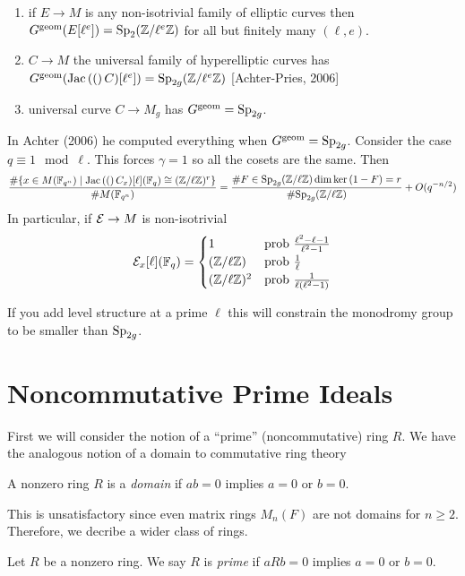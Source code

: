 \documentclass[12pt]{article}
\begin{document}
\begin{example}
\begin{enumerate}
\item if $E \to M$ is any non-isotrivial family of elliptic curves then $G^{\mathrm{geom}}(E[\ell^e]) = \mathrm{Sp}_2(\mathbb{Z} / \ell^e \mathbb{Z})$ for all but finitely many $(\ell, e)$. 
\item $C \to M$ the universal family of hyperelliptic curves has $G^{\mathrm{geom}}(\mathrm{Jac}\left( ( \right)C)[\ell^e]) = \mathrm{Sp}_{2g}(\mathbb{Z} / \ell^e \mathbb{Z})$ [Achter-Pries, 2006]
\item universal curve $C \to M_g$ has $G^{\mathrm{geom}} = \mathrm{Sp}_{2g}$. 
\end{enumerate}

In Achter (2006) he computed everything when $G^{\mathrm{geom}} = \mathrm{Sp}_{2g}$. Consider the case $q \equiv 1 \mod \ell$. This forces $\gamma = 1$ so all the cosets are the same. Then
\[ \frac{\# \{ x \in M(\mathbb{F}_{q^n}) \mid \mathrm{Jac}\left( ( \right)C_x)[\ell](\mathbb{F}_q) \cong (\mathbb{Z} / \ell \mathbb{Z})^r \}}{\# M(\mathbb{F}_{q^n})} = \frac{\# F \in \mathrm{Sp}_{2g}(\mathbb{Z} / \ell \mathbb{Z}) \dim \ker{(1 - F)} = r}{\# \mathrm{Sp}_{2g}(\mathbb{Z} / \ell \mathbb{Z})} + O(q^{-n/2}) \]
In particular, if $\mathcal{E} \to M$ is non-isotrivial 
\[ \mathcal{E}_x[\ell](\mathbb{F}_q) = 
\begin{cases}
1 & \text{prob } \frac{\ell^2 - \ell - 1}{\ell^2 - 1}
\\
(\mathbb{Z} / \ell \mathbb{Z}) & \text{prob } \frac{1}{\ell}
\\
(\mathbb{Z} / \ell \mathbb{Z})^2 & \text{prob } \frac{1}{\ell (\ell^2 - 1)}
\end{cases} \] 
\end{example}

If you add level structure at a prime $\ell$ this will constrain the monodromy group to be smaller than $\mathrm{Sp}_{2g}$. 

\section{Noncommutative Prime Ideals}

First we will consider the notion of a ``prime'' (noncommutative) ring $R$. We have the analogous notion of a domain to commutative ring theory

\begin{defn}
A nonzero ring $R$ is a \textit{domain} if $ab = 0$ implies $a = 0$ or $b = 0$.
\end{defn} 

This is unsatisfactory since even matrix rings $M_n(F)$ are not domains for $n \ge 2$. Therefore, we decribe a wider class of rings.

\begin{defn}
Let $R$ be a nonzero ring. We say $R$ is \textit{prime} if $a R b = 0$ implies $a = 0$ or $b = 0$.
\end{defn}
\end{document}

